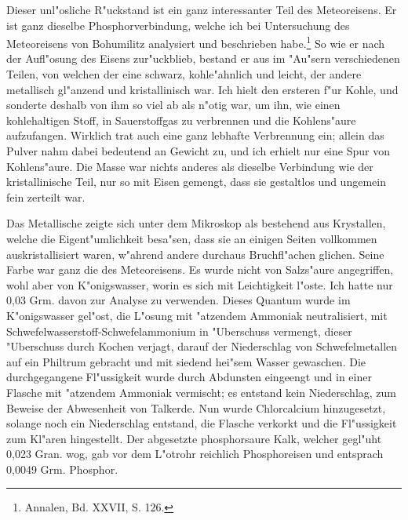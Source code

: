 \documentclass[a4paper, 11pt, oneside]{article}
\begin{document}
Dieser unl"osliche R"uckstand ist ein ganz interessanter Teil des Meteoreisens. Er ist ganz dieselbe Phosphorverbindung, welche ich bei Untersuchung des Meteoreisens von Bohumilitz analysiert und beschrieben habe.\footnote{Annalen, Bd. XXVII, S. 126.} So wie er nach der Aufl"osung des Eisens zur"uckblieb, bestand er aus im "Au"sern verschiedenen Teilen, von welchen der eine schwarz, kohle"ahnlich und leicht, der andere metallisch gl"anzend und kristallinisch war. Ich hielt den ersteren f"ur Kohle, und sonderte deshalb von ihm so viel ab als n"otig war, um ihn, wie einen kohlehaltigen Stoff, in Sauerstoffgas zu verbrennen und die Kohlens"aure aufzufangen. Wirklich trat auch eine ganz lebhafte Verbrennung ein; allein das Pulver nahm dabei bedeutend an Gewicht zu, und ich erhielt nur eine Spur von Kohlens"aure. Die Masse war nichts anderes als dieselbe Verbindung wie der kristallinische Teil, nur so mit Eisen gemengt, dass sie gestaltlos und ungemein fein zerteilt war.

Das Metallische zeigte sich unter dem Mikroskop als bestehend aus Krystallen, welche die Eigent"umlichkeit besa"sen, dass sie an einigen Seiten vollkommen auskristallisiert waren, w"ahrend andere durchaus Bruchfl"achen glichen. Seine Farbe war ganz die des Meteoreisens. Es wurde nicht von Salzs"aure angegriffen, wohl aber von K"onigswasser, worin es sich mit Leichtigkeit l"oste. Ich hatte nur 0,03 Grm. davon zur Analyse zu verwenden. Dieses Quantum wurde im K"onigswasser gel"ost, die L"osung mit "atzendem Ammoniak neutralisiert, mit Schwefelwasserstoff-Schwefelammonium in "Uberschuss vermengt, dieser "Uberschuss durch Kochen verjagt, darauf der Niederschlag von Schwefelmetallen auf ein Philtrum gebracht und mit siedend hei"sem Wasser gewaschen. Die durchgegangene Fl"ussigkeit wurde durch Abdunsten eingeengt und in einer Flasche mit "atzendem Ammoniak vermischt; es entstand kein Niederschlag, zum Beweise der Abwesenheit von Talkerde. Nun wurde Chlorcalcium hinzugesetzt, solange noch ein Niederschlag entstand, die Flasche verkorkt und die Fl"ussigkeit zum Kl"aren hingestellt. Der abgesetzte phosphorsaure Kalk, welcher gegl"uht 0,023 Gran. wog, gab vor dem L"otrohr reichlich Phosphoreisen und entsprach 0,0049 Grm. Phosphor.
\end{document}
